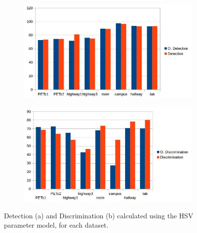 \documentclass[12pt]{report}
\begin{document}
\begin{figure}
\centering
\begin{subfigure}{1\linewidth}
  \includegraphics[width=1\linewidth]{figures/model/detect_hsv.jpg}
  \caption{}
\end{subfigure}
\hfill
\begin{subfigure}{1\linewidth}
  \includegraphics[width=1\linewidth]{figures/model/discrim_hsv.jpg}
  \caption{}
\end{subfigure}

\caption{Detection (a) and Discrimination (b) calculated using the HSV parameter model, for each dataset.}
\label{fig:bars_hsv_calc}
\end{figure}
\end{document}
